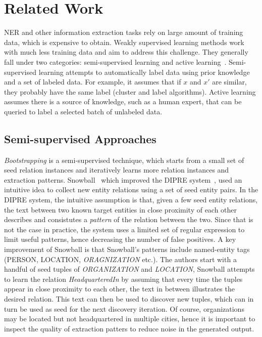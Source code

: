 \section{Related Work}
\label{sect:apner_related}
NER and other information extraction tasks rely on large amount of training data, which is expensive to obtain.
Weakly supervised learning methods work with much less training data and aim to address this challenge.
They generally fall under two categories: semi-supervised learning and active learning~\cite{zhou2017brief}.
Semi-supervised learning attempts to automatically label data using prior knowledge and a set of labeled data. 
For example, it assumes that if $x$ and $x\prime$ are similar, they probably have the same label (cluster and label algorithms).
Active learning assumes there is a source of knowledge, such as a human expert, that can be queried 
to label a selected batch of unlabeled data. 


\subsection{Semi-supervised Approaches}
\textit{Bootstrapping} is a semi-supervised technique, which starts from a small set of seed relation instances and iteratively learns more relation instances and extraction patterns.
Snowball~\cite{agichtein2000snowball} which improved the DIPRE system~\cite{brin1998extracting}, used an intuitive idea to collect new entity relations using a set of seed entity pairs.
In the DIPRE system, the intuitive assumption is that, given a few seed entity relations, the text between two known target entities in close proximity of each other describes and consistutes a \textit{pattern} of the relation between the two. 
Since that is not the case in practice, the system uses a limited set of regular expression to limit useful patterns, hence decreasing the number of false positives.
A key improvement of Snowball
is that Snowball's patterns include named-entity tags ({PERSON}, {LOCATION}, \textit{ORAGNIZATION} etc.).
The authors start with a handful of seed tuples of \textit{ORGANIZATION} and \textit{LOCATION}, Snowball attempts to learn the relation \textit{HeadquarteredIn} by assuming that every time the tuples appear in close proximity to each other, the text in between illustrates the desired relation.
This text can then be used to discover new tuples, which can in turn be used as seed for the next discovery iteration.
Of course, organizations may be located but not headquartered in multiple cities, hence it is important to inspect the quality of extraction patters to reduce noise in the generated output.

